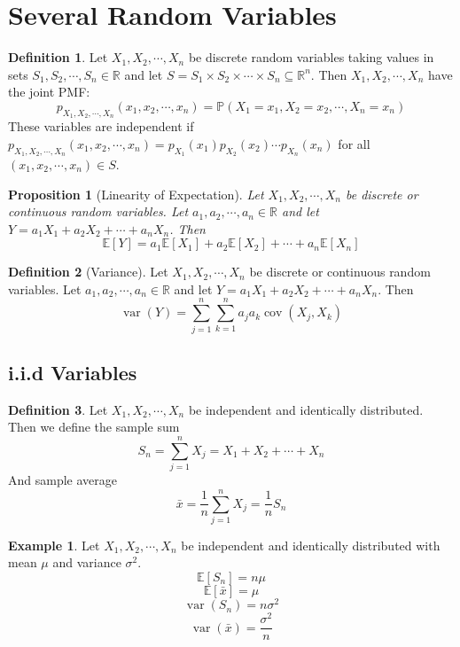 \documentclass[
]{article}
\newtheorem{proposition}{Proposition}[section]
\theoremstyle{definition}
\newtheorem{definition}{Definition}[section]
\theoremstyle{definition}
\newtheorem{example}{Example}[section]
\theoremstyle{definition}
\theoremstyle{remark}
\newcommand{\prob}[1]{\mathbb{P}\left(#1\right)}
\newcommand{\R}{\mathbb{R}}
\newcommand{\E}[1]{\mathbb{E}[#1]}
\newcommand{\cov}[1]{\operatorname{cov}\left(#1\right)}
\newcommand{\var}[1]{\operatorname{var}\left(#1\right)}
\begin{document}
\section{Several Random Variables}

\begin{definition}
  Let $X_1, X_2, \cdots, X_n$ be discrete random variables taking values in sets $S_1, S_2, \cdots, S_n \in \R$ and let $ S = S_1 \times S_2 \times \cdots \times S_n \subseteq \R^n$.
  Then $X_1, X_2, \cdots, X_n$ have the joint PMF:
  \[p_{X_1, X_2, \cdots, X_n}(x_1, x_2, \cdots, x_n) = \prob{X_1 = x_1, X_2 = x_2, \cdots, X_n = x_n}\]
  These variables are independent if $p_{X_1, X_2, \cdots, X_n}(x_1, x_2, \cdots, x_n) = p_{X_1}(x_1)p_{X_2}(x_2)\cdots p_{X_n}(x_n)$
  for all $(x_1, x_2, \cdots, x_n) \in S$.
\end{definition}

\begin{proposition}[Linearity of Expectation]
  Let $X_1, X_2, \cdots, X_n$ be discrete or continuous random variables. Let $a_1, a_2, \cdots, a_n \in \R$ and let
  $Y = a_1X_1 + a_2X_2 + \cdots + a_nX_n$. Then
  \[\E{Y} = a_1\E{X_1} + a_2\E{X_2} + \cdots + a_n\E{X_n}\]
\end{proposition}

\begin{definition}[Variance]
  Let $X_1, X_2, \cdots, X_n$ be discrete or continuous random variables. Let $a_1, a_2, \cdots, a_n \in \R$ and let
  $Y = a_1X_1 + a_2X_2 + \cdots + a_nX_n$. Then
  \[\var{Y} = \sum_{j = 1}^{n}\sum_{k = 1}^{n}a_ja_k\cov{X_j, X_k}  \]
\end{definition}

\subsection{i.i.d Variables}

\begin{definition}
  Let $X_1, X_2, \cdots, X_n$ be independent and identically distributed. Then we define the sample sum
  \[S_n = \sum_{j = 1}^{n} X_j = X_1 + X_2 + \cdots + X_n \]
  And sample average
  \[\bar{x} = \frac{1}{n} \sum_{j = 1}^{n} X_j = \frac{1}{n}S_n\]
\end{definition}

\begin{example}
  Let $X_1, X_2, \cdots, X_n$ be independent and identically distributed with mean $\mu$ and variance $\sigma^2$.
  \[\E{S_n} = n\mu\]
  \[\E{\bar{x}} = \mu\]
  \[\var{S_n} = n\sigma^2\]
  \[\var{\bar{x}} = \frac{\sigma^2}{n}\]
\end{example}
\end{document}
